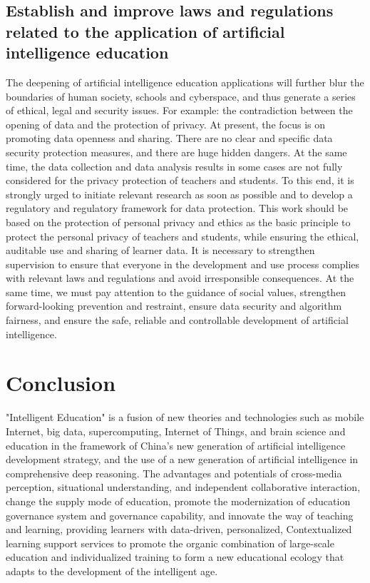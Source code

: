 \documentclass[11pt,en,authoryear]{elegantpaper}
\begin{document}
\subsection{Establish and improve laws and regulations related to the application of artificial intelligence education}
The deepening of artificial intelligence education applications will further blur the boundaries of human society, schools and cyberspace, and thus generate a series of ethical, legal and security issues. For example: the contradiction between the opening of data and the protection of privacy. At present, the focus is on promoting data openness and sharing. There are no clear and specific data security protection measures, and there are huge hidden dangers. At the same time, the data collection and data analysis results in some cases are not fully considered for the privacy protection of teachers and students. To this end, it is strongly urged to initiate relevant research as soon as possible and to develop a regulatory and regulatory framework for data protection. This work should be based on the protection of personal privacy and ethics as the basic principle to protect the personal privacy of teachers and students, while ensuring the ethical, auditable use and sharing of learner data. It is necessary to strengthen supervision to ensure that everyone in the development and use process complies with relevant laws and regulations and avoid irresponsible consequences. At the same time, we must pay attention to the guidance of social values, strengthen forward-looking prevention and restraint, ensure data security and algorithm fairness, and ensure the safe, reliable and controllable development of artificial intelligence.


\section{Conclusion}
"Intelligent Education" is a fusion of new theories and technologies such as mobile Internet, big data, supercomputing, Internet of Things, and brain science and education in the framework of China's new generation of artificial intelligence development strategy, and the use of a new generation of artificial intelligence in comprehensive deep reasoning. The advantages and potentials of cross-media perception, situational understanding, and independent collaborative interaction, change the supply mode of education, promote the modernization of education governance system and governance capability, and innovate the way of teaching and learning, providing learners with data-driven, personalized, Contextualized learning support services to promote the organic combination of large-scale education and individualized training to form a new educational ecology that adapts to the development of the intelligent age.
\end{document}
